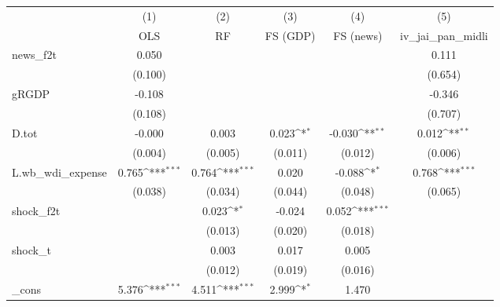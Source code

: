 {
\def\sym#1{\ifmmode^{#1}\else\(^{#1}\)\fi}
\begin{tabular}{l*{5}{c}}
\toprule
            &\multicolumn{1}{c}{(1)}&\multicolumn{1}{c}{(2)}&\multicolumn{1}{c}{(3)}&\multicolumn{1}{c}{(4)}&\multicolumn{1}{c}{(5)}\\
            &\multicolumn{1}{c}{OLS}&\multicolumn{1}{c}{RF}&\multicolumn{1}{c}{FS (GDP)}&\multicolumn{1}{c}{FS (news)}&\multicolumn{1}{c}{iv\_jai\_pan\_midli}\\
\midrule
news\_f2t    &       0.050         &                     &                     &                     &       0.111         \\
            &     (0.100)         &                     &                     &                     &     (0.654)         \\
\addlinespace
gRGDP       &      -0.108         &                     &                     &                     &      -0.346         \\
            &     (0.108)         &                     &                     &                     &     (0.707)         \\
\addlinespace
D.tot       &      -0.000         &       0.003         &       0.023\sym{*}  &      -0.030\sym{**} &       0.012\sym{**} \\
            &     (0.004)         &     (0.005)         &     (0.011)         &     (0.012)         &     (0.006)         \\
\addlinespace
L.wb\_wdi\_expense&       0.765\sym{***}&       0.764\sym{***}&       0.020         &      -0.088\sym{*}  &       0.768\sym{***}\\
            &     (0.038)         &     (0.034)         &     (0.044)         &     (0.048)         &     (0.065)         \\
\addlinespace
shock\_f2t   &                     &       0.023\sym{*}  &      -0.024         &       0.052\sym{***}&                     \\
            &                     &     (0.013)         &     (0.020)         &     (0.018)         &                     \\
\addlinespace
shock\_t     &                     &       0.003         &       0.017         &       0.005         &                     \\
            &                     &     (0.012)         &     (0.019)         &     (0.016)         &                     \\
\addlinespace
\_cons      &       5.376\sym{***}&       4.511\sym{***}&       2.999\sym{*}  &       1.470         &                     \\

\end{tabular}}
